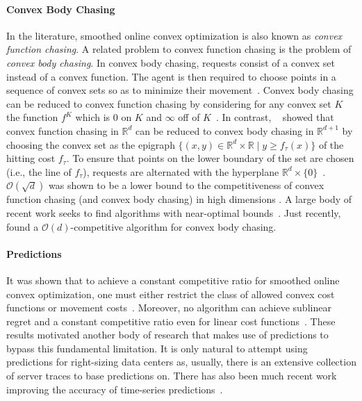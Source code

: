 \paragraph{Convex Body Chasing} In the literature, smoothed online convex optimization is also known as \emph{convex function chasing}. A related problem to convex function chasing is the problem of \emph{convex body chasing}. In convex body chasing, requests consist of a convex set instead of a convex function. The agent is then required to choose points in a sequence of convex sets so as to minimize their movement~\cite{Antoniadis2016}. Convex body chasing can be reduced to convex function chasing by considering for any convex set $K$ the function $f^K$ which is 0 on $K$ and $\infty$ off of $K$~\cite{Sellke2019}. In contrast,  \citeauthor{Sellke2019}~\cite{Sellke2019} showed that convex function chasing in $\mathbb{R}^d$ can be reduced to convex body chasing in $\mathbb{R}^{d+1}$ by choosing the convex set as the epigraph $\{(x,y) \in \mathbb{R}^d \times \mathbb{R} \mid y \geq f_{\tau}(x)\}$ of the hitting cost $f_{\tau}$. To ensure that points on the lower boundary of the set are chosen (i.e., the line of $f_{\tau}$), requests are alternated with the hyperplane $\mathbb{R}^d \times \{0\}$~\cite{Sellke2019}. $\mathcal{O}(\sqrt{d})$ was shown to be a lower bound to the competitiveness of convex function chasing (and convex body chasing) in high dimensions \cite{Chen2018}. A large body of recent work seeks to find algorithms with near-optimal bounds~\cite{Bansal2017, Bubeck2018, Bubeck2018_2, Argue2019_2, Argue2019, Argue2020, Bubeck2020}. Just recently, \citeauthor{Argue2019}~\cite{Argue2019} found a $\mathcal{O}(d)$-competitive algorithm for convex body chasing.

\paragraph{Predictions} It was shown that to achieve a constant competitive ratio for smoothed online convex optimization, one must either restrict the class of allowed convex cost functions or movement costs~\cite{Chen2018}. Moreover, no algorithm can achieve sublinear regret and a constant competitive ratio even for linear cost functions~\cite{Andrew2015}. These results motivated another body of research that makes use of predictions to bypass this fundamental limitation. It is only natural to attempt using predictions for right-sizing data centers as, usually, there is an extensive collection of server traces to base predictions on. There has also been much recent work improving the accuracy of time-series predictions~\cite{Taylor2017, Benidis2020, Chen2020, Hosseini2021}.

